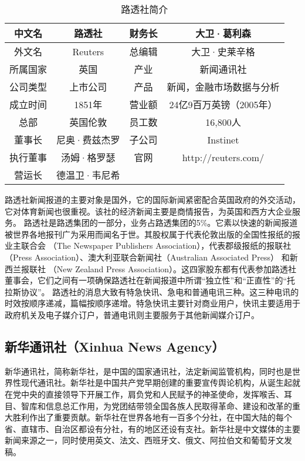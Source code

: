 \documentclass[a4paper,openany]{book}
\begin{document}
\begin{table}[ht]
\centering
\setlength{\belowcaptionskip}{5pt}
\caption{路透社简介}
\begin{tabular}{|c|c|c|c|}
\hline
中文名  & 路透社     & 财务长 & 大卫·葛利森              \\ \hline
外文名  & Reuters & 总编辑 & 大卫·史莱辛格             \\ \hline
所属国家 & 英国      & 产业  & 新闻通讯社               \\ \hline
公司类型 & 上市公司    & 产品  & 新闻，金融市场数据与分析        \\ \hline
成立时间 & 1851年   & 营业额 & 24亿9百万英镑（2005年）     \\ \hline
总部   & 英国伦敦    & 员工数 & 16,800人             \\ \hline
董事长  & 尼奥·费兹杰罗 & 子公司 & Instinet            \\ \hline
执行董事 & 汤姆·格罗瑟  & 官网  & http://reuters.com/ \\ \hline
营运长  & 德温卫·韦尼希 &     &                     \\ \hline
\end{tabular}
\end{table}

路透社新闻报道的主要对象是国外，它的国际新闻紧密配合英国政府的外交活动，它对体育新闻也很重视。该社的经济新闻主要是商情报告，为英国和西方大企业服务。
路透社是路透集团的一部分，业务占路透集团的5\%。它素以快速的新闻报道被世界各地报刊广为采用而闻名于世。其股权属于代表伦敦出版的全国性报纸的报业主联合会 （The Newspaper Publishers Association），代表郡级报纸的报联社 （Press Association）、澳大利亚联合新闻社（Australian Associated Press） 和新西兰报联社 （New Zealand Press Association）。这四家股东都有代表参加路透社董事会，它们之间有一项确保路透社在新闻报道中所谓“独立性”和“正直性”的“托拉斯协议”。
路透社的消息大致有特急快讯、急电和普通电讯三种。这三种电讯的时效按顺序递减，篇幅按顺序递增。特急快讯主要针对商业用户，快讯主要适用于政府机关及电子媒介订户，普通电讯则主要服务于其他新闻媒介订户。

\subsection{新华通讯社（Xinhua News Agency）}

新华通讯社，简称新华社，是中国的国家通讯社，法定新闻监管机构，同时也是世界性现代通讯社。新华社是中国共产党早期创建的重要宣传舆论机构，从诞生起就在党中央的直接领导下开展工作，肩负党和人民赋予的神圣使命，发挥喉舌、耳目、智库和信息总汇作用，为党团结带领全国各族人民取得革命、建设和改革的重大胜利作出了重要贡献。新华社在世界各地有一百多个分社，在中国大陆的每个省、直辖市、自治区都设有分社，有的地区还设有支社。新华社是中文媒体的主要新闻来源之一，同时使用英文、法文、西班牙文、俄文、阿拉伯文和葡萄牙文发稿。
\end{document}
